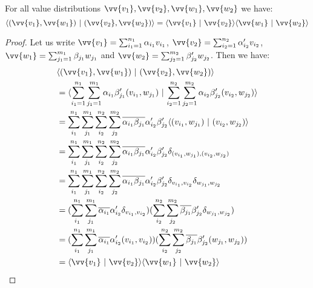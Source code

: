 \documentclass[runningheads,orivec,envcountsame,envcountsect]{llncs}
\def\scal#1#2{\langle{#1}~|~{#2}\rangle}
\def\Pair#1#2{(#1,#2)} %
\def\Kron#1#2{\ensuremath{\delta_{#1,#2}}}
\begin{document}
\begin{theorem}\label{prop:InnerProdPairs} For all value distributions $\vv{v_1}, \vv{v_2}, \vv{w_1}, \vv{w_2}$ we have:
\[
\scal{\Pair{\vv{v_1}}{\vv{w_1}}}{\Pair{\vv{v_2}}{\vv{w_2}}} = \scal{\vv{v_1}}{\vv{v_2}}\scal{\vv{w_1}}{\vv{w_2}}
\]
\begin{proof}
    Let us write $\vv{v_1}=\sum_{i_1=1}^{n_1}\alpha_{i_1} v_{i_1}$, $\vv{v_2}=\sum_{i_2=1}^{n_2}\alpha'_{i_2} v_{i_2}$, $\vv{w_1}=\sum_{j_1=1}^{m_1}\beta_{j_1} w_{j_1}$ and $\vv{w_2}=\sum_{j_2=1}^{m_2}\beta'_{j_2} w_{j_2}$. Then we have:
    \begin{align*}
        &\scal{\Pair{\vv{v_1}}{\vv{w_1}}}{\Pair{\vv{v_2}}{\vv{w_2}}}\\
        &=\scal{\sum_{i_1=1}^{n_1}\sum_{j_1=1}^{m_1} \alpha_{i_1}\beta'_{j_1}\Pair{v_{i_1}}{w_{j_1}}}{\sum_{i_2=1}^{n_2}\sum_{j_2=1}^{m_2} \alpha_{i_2}\beta'_{j_2}\Pair{v_{i_2}}{w_{j_2}}}\\
        &=\sum_{i_1}^{n_1}\sum_{j_1}^{m_1}\sum_{i_2}^{n_2}\sum_{j_2}^{m_2} \overline{\alpha_{i_1}\beta_{j_1}} \alpha'_{i_2}\beta'_{j_2} \scal{\Pair{v_{i_1}}{w_{j_1}}}{\Pair{v_{i_2}}{w_{j_2}}}\\
        &=\sum_{i_1}^{n_1}\sum_{j_1}^{m_1}\sum_{i_2}^{n_2}\sum_{j_2}^{m_2} \overline{\alpha_{i_1}\beta_{j_1}} \alpha'_{i_2}\beta'_{j_2} \Kron{\Pair{v_{i_1}}{w_{j_1}}}{\Pair{v_{i_2}}{w_{j_2}}}\\
        &=\sum_{i_1}^{n_1}\sum_{j_1}^{m_1}\sum_{i_2}^{n_2}\sum_{j_2}^{m_2} \overline{\alpha_{i_1}\beta_{j_1}} \alpha'_{i_2}\beta'_{j_2} \Kron{v_{i_1}}{v_{i_2}}\Kron{w_{j_1}}{w_{j_2}}\\
        &=(\sum_{i_1}^{n_1}\sum_{j_1}^{m_1}\overline{\alpha_{i_1}}\alpha'_{i_2}\Kron{v_{i_1}}{v_{i_2}})(\sum_{i_2}^{n_2}\sum_{j_2}^{m_2} \overline{\beta_{j_1}} \beta'_{j_2} \Kron{w_{j_1}}{w_{j_2}})\\
        &=(\sum_{i_1}^{n_1}\sum_{j_1}^{m_1}\overline{\alpha_{i_1}}\alpha'_{i_2}\Pair{v_{i_1}}{v_{i_2}})(\sum_{i_2}^{n_2}\sum_{j_2}^{m_2} \overline{\beta_{j_1}} \beta'_{j_2} \Pair{w_{j_1}}{w_{j_2}})\\
        &=\scal{\vv{v_1}}{\vv{v_2}}\scal{\vv{w_1}}{\vv{w_2}}\\
    \end{align*}
\end{proof}  

\end{theorem}
\end{document}
